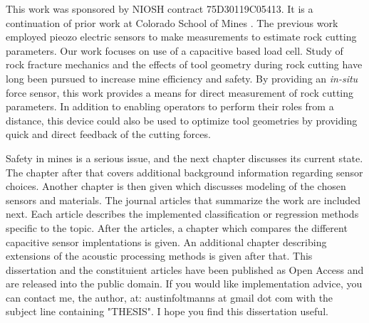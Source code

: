 This work was sponsored by NIOSH contract 75D30119C05413.
It is a continuation of prior work at Colorado School of Mines \cite{11124/170545}.
The previous work employed pieozo electric sensors to make measurements to estimate
rock cutting parameters. 
Our work focuses on use of a capacitive based load cell.
Study of rock fracture mechanics \cite{11124/14359} 
and the effects of tool geometry during rock cutting \cite{11124/13192, 11124/16423, 11124/176345} 
have long been pursued to increase mine efficiency and safety.
By providing an \textit{in-situ} force sensor, this work provides a means
for direct measurement of rock cutting parameters.
In addition to enabling operators to perform their roles from a distance,
this device could also be used to optimize tool geometries 
by providing quick and direct feedback of the cutting forces.

Safety in mines is a serious issue, and the next chapter discusses its current state.
The chapter after that covers additional background information regarding sensor choices.
Another chapter is then given which discusses modeling of the chosen sensors and materials.
The journal articles that summarize the work are included next. 
Each article describes the implemented classification or regression methods specific to the topic.
After the articles, a chapter which compares the different capacitive sensor implentations is given.
An additional chapter describing extensions of the acoustic processing methods is given after that.
This dissertation and the constituient articles have been published as 
Open Access and are released into the public domain.
If you would like implementation advice, you can contact me, the author, at:
austinfoltmanns at gmail dot com with the subject line containing "THESIS".
I hope you find this dissertation useful.

